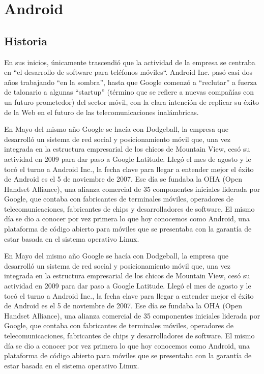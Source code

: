 \documentclass{bmcart}
\begin{document}
\newpage  

\section*{Android}

\subsection*{Historia}
En sus inicios, únicamente trascendió que la actividad de la empresa se
centraba en “el desarrollo de software para teléfonos móviles“.\newline
Android Inc. pasó casi dos años trabajando “en la sombra”, hasta que Google comenzó
a “reclutar” a fuerza de talonario a algunas “startup” (término que se refiere a nuevas
compañías con un futuro prometedor) del sector móvil, con la clara intención de replicar su
éxito de la Web en el futuro de las telecomunicaciones inalámbricas.

En Mayo del mismo año Google se hacía con Dodgeball, la empresa que desarrolló un
sistema de red social y posicionamiento móvil que, una vez integrada en la estructura
empresarial de los chicos de Mountain View, cesó su actividad en 2009 para dar paso a Google
Latitude. Llegó el mes de agosto y le tocó el turno a Android Inc., la fecha clave para llegar a
entender mejor el éxito de Android es el 5 de noviembre de 2007. Ese día se fundaba la OHA
(Open Handset Alliance), una alianza comercial de 35 componentes iniciales liderada por
Google, que contaba con fabricantes de terminales móviles, operadores de
telecomunicaciones, fabricantes de chips y desarrolladores de software. El mismo día se dio a
conocer por vez primera lo que hoy conocemos como Android, una plataforma de código
abierto para móviles que se presentaba con la garantía de estar basada en el sistema operativo
Linux. 

En Mayo del mismo año Google se hacía con Dodgeball, la empresa que desarrolló un
sistema de red social y posicionamiento móvil que, una vez integrada en la estructura
empresarial de los chicos de Mountain View, cesó su actividad en 2009 para dar paso a Google
Latitude. Llegó el mes de agosto y le tocó el turno a Android Inc., la fecha clave para llegar a
entender mejor el éxito de Android es el 5 de noviembre de 2007. Ese día se fundaba la OHA
(Open Handset Alliance), una alianza comercial de 35 componentes iniciales liderada por
Google, que contaba con fabricantes de terminales móviles, operadores de
telecomunicaciones, fabricantes de chips y desarrolladores de software. El mismo día se dio a
conocer por vez primera lo que hoy conocemos como Android, una plataforma de código
abierto para móviles que se presentaba con la garantía de estar basada en el sistema operativo
Linux. \cite{herraiz2012android}\cite{baez1997introduccion}\cite{benbourahala2013android}\newline
\end{document}
